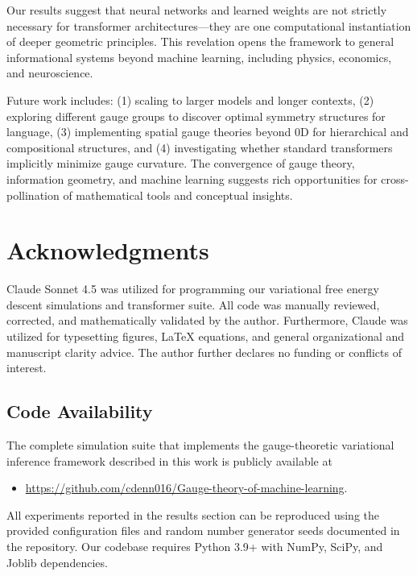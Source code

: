 \documentclass[twoside,11pt]{article}
\begin{document}
Our results suggest that neural networks and learned weights are not strictly necessary for transformer architectures---they are one computational instantiation of deeper geometric principles. This revelation opens the framework to general informational systems beyond machine learning, including physics, economics, and neuroscience.

Future work includes: (1) scaling to larger models and longer contexts, (2) exploring different gauge groups to discover optimal symmetry structures for language, (3) implementing spatial gauge theories beyond 0D for hierarchical and compositional structures, and (4) investigating whether standard transformers implicitly minimize gauge curvature. The convergence of gauge theory, information geometry, and machine learning suggests rich opportunities for cross-pollination of mathematical tools and conceptual insights.

\section*{Acknowledgments}
Claude Sonnet 4.5 was utilized for programming our variational free energy descent simulations and transformer suite.  All code was manually reviewed, corrected, and mathematically validated by the author.  Furthermore, Claude was utilized for typesetting figures, LaTeX equations, and general organizational and manuscript clarity advice. The author further declares no funding or conflicts of interest.

\subsection{Code Availability}
The complete simulation suite that implements the gauge-theoretic variational inference framework described in this work is publicly available at 

\begin{itemize}
\item \href{https://github.com/cdenn016/Gauge-theory-of-machine-learning}{https://github.com/cdenn016/Gauge-theory-of-machine-learning}. 
\end{itemize}

All experiments reported in the results section can be reproduced using the provided configuration files and random number generator seeds documented in the repository. Our codebase requires Python 3.9+ with NumPy, SciPy, and Joblib dependencies.




\end{document}
